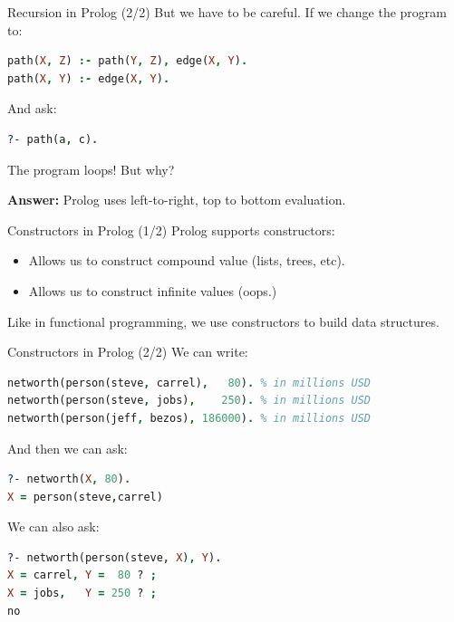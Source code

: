\begin{frame}[fragile]{Recursion in Prolog (2/2)}
But we have to be careful. If we change the program to:

\begin{lstlisting}[language=prolog, xleftmargin=0.5cm]
path(X, Z) :- path(Y, Z), edge(X, Y).
path(X, Y) :- edge(X, Y).
\end{lstlisting}

\pause

And ask:

\begin{lstlisting}[language=prolog, xleftmargin=0.5cm]
?- path(a, c).
\end{lstlisting}

\pause

The program loops! But why?

\pause

\textbf{Answer:} Prolog uses left-to-right, top to bottom evaluation.
\end{frame}

\begin{frame}{Constructors in Prolog (1/2)}
Prolog supports constructors:

\begin{itemize}
    \item Allows us to construct compound value (lists, trees, etc).
    \item Allows us to construct infinite values (oops.)
\end{itemize}

Like in functional programming, we use constructors to build data structures.
\end{frame}

\begin{frame}[fragile]{Constructors in Prolog (2/2)}
We can write:

\begin{lstlisting}[language=prolog, xleftmargin=0.5cm]
networth(person(steve, carrel),   80). % in millions USD
networth(person(steve, jobs),    250). % in millions USD
networth(person(jeff, bezos), 186000). % in millions USD
\end{lstlisting}

\pause

And then we can ask:

\begin{lstlisting}[language=prolog, xleftmargin=0.5cm]
?- networth(X, 80).
X = person(steve,carrel)
\end{lstlisting}

\pause

We can also ask:

\begin{lstlisting}[language=prolog, xleftmargin=0.5cm]
?- networth(person(steve, X), Y).
X = carrel, Y =  80 ? ;
X = jobs,   Y = 250 ? ;
no
\end{lstlisting}
\end{frame}

